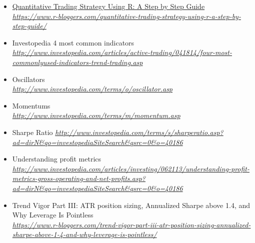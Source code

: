 \documentclass[12pt,]{article}
\begin{document}
\begin{itemize}
\item
  \href{https://www.r-bloggers.com/quantitative-trading-strategy-using-r-a-step-by-step-guide/}{Quantitative
  Trading Strategy Using R: A Step by Step Guide}\\
  \emph{\url{https://www.r-bloggers.com/quantitative-trading-strategy-using-r-a-step-by-step-guide/}
  }
\item
  Investopedia 4 most common indicators\\
  \emph{\url{http://www.investopedia.com/articles/active-trading/041814/four-most-commonlyused-indicators-trend-trading.asp}
  }
\item
  Oscillators\\
  \emph{\url{http://www.investopedia.com/terms/o/oscillator.asp} }
\item
  Momentums\\
  \emph{\url{http://www.investopedia.com/terms/m/momentum.asp} }
\item
  Sharpe Ratio
  \emph{\url{http://www.investopedia.com/terms/s/sharperatio.asp?ad=dirN\&qo=investopediaSiteSearch\&qsrc=0\&o=40186}
  }
\item
  Understanding profit metrics\\
  \emph{\url{http://www.investopedia.com/articles/investing/062113/understanding-profit-metrics-gross-operating-and-net-profits.asp?ad=dirN\&qo=investopediaSiteSearch\&qsrc=0\&o=40186}
  }
\item
  Trend Vigor Part III: ATR position sizing, Annualized Sharpe above
  1.4, and Why Leverage Is Pointless\\
  \emph{\url{https://www.r-bloggers.com/trend-vigor-part-iii-atr-position-sizing-annualized-sharpe-above-1-4-and-why-leverage-is-pointless/}
  }
\end{itemize}
\end{document}
